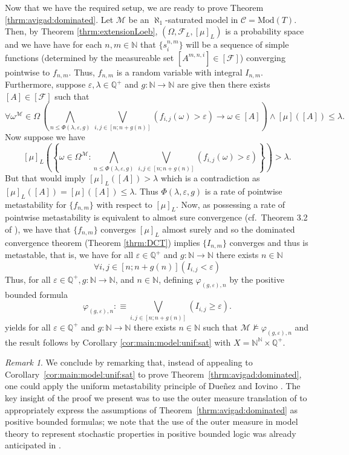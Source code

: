 \documentclass[11pt]{amsart}
\theoremstyle{definition}
\theoremstyle{remark}
\newtheorem{remark}[theorem]{Remark}
\newcommand{\seq}[1]{\{{#1}\}}
\def\NN{\mathbb{N}}
\def\QQ{\mathbb{Q}}
\begin{document}
Now that we have the required setup, we are ready to prove Theorem \ref{thrm:avigad:dominated}. Let $\mathcal{M}$ be an $\aleph_1$-saturated model in $\mathscr{C}=\mathrm{Mod}(T)$. Then, by Theorem \ref{thrm:extensionLoeb}, $(\Omega,\mathcal{F}_L,[\mu]_L)$ is a probability space and we have have for each $n,m \in \NN$ that $\seq{s_i^{n,m}}$ will be a sequence of simple functions (determined by the measureable set $[A^{m,n,i}] \in [\mathcal{F}] $) converging pointwise to $f_{n,m}$. Thus, $f_{n,m}$ is a random variable with integral $I_{n,m}$. Furthermore, suppose $\varepsilon, \lambda \in \QQ^+$ and $g: \NN \to \NN$ are give then there exists $[A] \in [\mathcal{F}]$ such that
 \[
 \forall \omega^\mathcal{M} \in \Omega \,\left(\bigwedge_ {n\leq \Phi(\lambda,\varepsilon,g)}\, \bigvee_{i,j\in [n;n+g(n)]}(f_{i,j}(\omega)> \varepsilon) \to \omega \in [A]\right) \land [\mu]([A]) \le \lambda.
 \]
 Now suppose we have 
 \[
 [\mu]_L\left(\left\{\omega \in \Omega^\mathcal{M} :\bigwedge_ {n\leq \Phi(\lambda,\varepsilon,g)}\, \bigvee_{i,j\in [n;n+g(n)]}(f_{i,j}(\omega)> \varepsilon)\right\}\right) > \lambda.
 \]
But that would imply $[\mu]_L([A]) > \lambda$ which is a contradiction as $[\mu]_L([A]) = [\mu]([A]) \le \lambda$. Thus $\Phi(\lambda,\varepsilon,g)$ is a rate of pointwise metastability for $\seq{f_{n,m}}$ with respect to $[\mu]_L$. Now, as possessing a rate of pointwise metastability is equivalent to almost sure convergence (cf.\ Theorem 3.2 of \cite{neri-powell:pp:martingale}), we have that $\seq{f_{n,m}}$ converges $[\mu]_L$ almost surely and so the dominated convergence theorem (Theorem \ref{thrm:DCT}) implies $\seq{I_{n,m}}$ converges and thus is metastable, that is, we have for all $\varepsilon \in \QQ^+$ and $g:\NN \to \NN$ there exists $n \in \NN$
\[
\forall i,j \in [n;n+g(n)](I_{i,j}<\varepsilon)
\]
Thus, for all $\varepsilon \in \QQ^+, g:\NN \to \NN$, and $n \in \NN$, defining $\varphi_{(g,\varepsilon),n}$ by the positive bounded formula
\[
\varphi_{(g,\varepsilon),n}:\equiv \bigvee_{i,j \in [n;n+g(n)]}(I_{i,j} \ge \varepsilon).
\]
yields  for all $\varepsilon \in \QQ^+$ and $g:\NN \to \NN$ there exists $n \in \NN$ such that $\mathcal{M}\nvDash\varphi_{(g,\varepsilon),n}$ and the result follows by Corollary \ref{cor:main:model:unif:sat} with $X = \NN^\NN \times \QQ^+$.

\begin{remark}
 We conclude by remarking that, instead of appealing to Corollary~\ref{cor:main:model:unif:sat} to prove Theorem~\ref{thrm:avigad:dominated}, one could apply the uniform metastability principle of Due\~{n}ez and Iovino \cite{DI2017}. The key insight of the proof we present was to use the outer measure translation of \cite{NeriOlivaPischke2026} to appropriately express the assumptions of Theorem~\ref{thrm:avigad:dominated} as positive bounded formulas; we note that the use of the outer measure in model theory to represent stochastic properties in positive bounded logic was already anticipated in \cite[Section~1.4]{NeriOlivaPischke2026}.
 
 

\end{remark}
\end{document}
